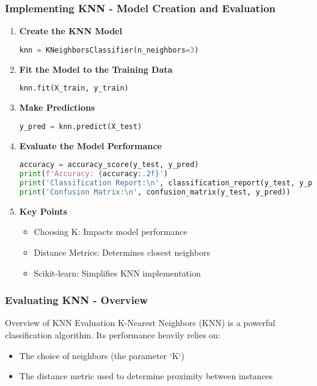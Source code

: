 \documentclass[aspectratio=169]{beamer}
\begin{document}
\begin{frame}[fragile]
    \frametitle{Implementing KNN - Model Creation and Evaluation}
    \begin{enumerate}[resume]
        \item \textbf{Create the KNN Model}
        \begin{lstlisting}[language=Python]
knn = KNeighborsClassifier(n_neighbors=3)
        \end{lstlisting}

        \item \textbf{Fit the Model to the Training Data}
        \begin{lstlisting}[language=Python]
knn.fit(X_train, y_train)
        \end{lstlisting}

        \item \textbf{Make Predictions}
        \begin{lstlisting}[language=Python]
y_pred = knn.predict(X_test)
        \end{lstlisting}

        \item \textbf{Evaluate the Model Performance}
        \begin{lstlisting}[language=Python]
accuracy = accuracy_score(y_test, y_pred)
print(f'Accuracy: {accuracy:.2f}')
print('Classification Report:\n', classification_report(y_test, y_pred))
print('Confusion Matrix:\n', confusion_matrix(y_test, y_pred))
        \end{lstlisting}

        \item \textbf{Key Points}
        \begin{itemize}
            \item Choosing K: Impacts model performance
            \item Distance Metrics: Determines closest neighbors
            \item Scikit-learn: Simplifies KNN implementation
        \end{itemize}
    \end{enumerate}
\end{frame}

\begin{frame}[fragile]
  \frametitle{Evaluating KNN - Overview}
  \begin{block}{Overview of KNN Evaluation}
    K-Nearest Neighbors (KNN) is a powerful classification algorithm. Its performance heavily relies on:
    \begin{itemize}
      \item The choice of neighbors (the parameter `K`)
      \item The distance metric used to determine proximity between instances
    \end{itemize}
  \end{block}
\end{frame}
\end{document}
